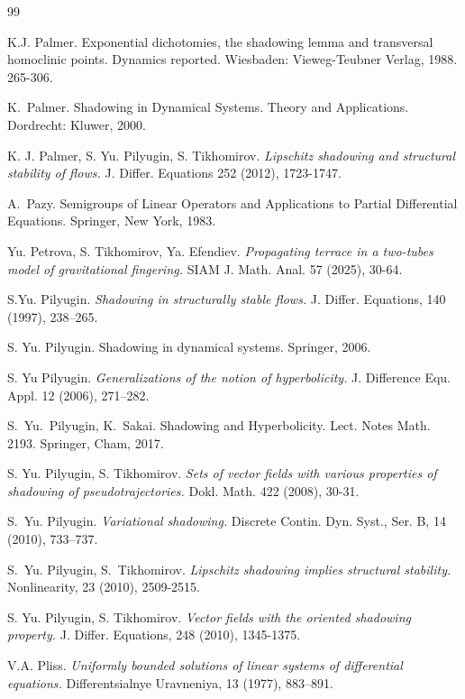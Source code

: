 \documentclass[12pt]{article}
\theoremstyle{definition}
\begin{document}
\begin{thebibliography}{99}
{
K.J. Palmer. Exponential dichotomies, the shadowing lemma and transversal homoclinic points. Dynamics reported. Wiesbaden: Vieweg-Teubner Verlag, 1988. 265-306.

K.~Palmer.
\newblock Shadowing in Dynamical Systems. Theory and Applications.
\newblock Dordrecht: Kluwer, 2000.

K. J. Palmer, S. Yu. Pilyugin, S. Tikhomirov.
\textit{Lipschitz shadowing and structural stability of flows.}
	J. Differ. Equations 252 (2012), 1723-1747.

A.~Pazy.
\newblock Semigroups of Linear Operators and Applications to Partial Differential Equations.
\newblock Springer, New York, 1983.

Yu. Petrova, S. Tikhomirov, Ya. Efendiev. \textit{Propagating terrace in a two-tubes model of gravitational fingering.} SIAM J. Math. Anal. 57 (2025), 30-64.

S.Yu. Pilyugin. \textit{Shadowing in structurally stable flows.} J. Differ. Equations, 140 (1997), 238–265.


 S. Yu. Pilyugin. Shadowing in dynamical systems. Springer, 2006.

 S. Yu Pilyugin. \textit{Generalizations of the notion of hyperbolicity.} J. Difference Equ. Appl. 12 (2006), 271–282.

S.~Yu.~Pilyugin, K.~Sakai.
\newblock Shadowing and Hyperbolicity.
\newblock Lect. Notes Math. 2193. Springer, Cham, 2017.

S. Yu. Pilyugin, S. Tikhomirov. \textit{Sets of vector fields with various properties of shadowing of pseudotrajectories.} Dokl. Math. 422 (2008), 30-31.

S.~Yu. Pilyugin.
\newblock \textit{Variational shadowing.}
\newblock Discrete Contin. Dyn. Syst., Ser. B, 14 (2010), 733--737.

S.~Yu. Pilyugin, S.~Tikhomirov.
\newblock \textit{Lipschitz shadowing implies structural stability.}
\newblock Nonlinearity, 23 (2010), 2509-2515.

S. Yu. Pilyugin, S. Tikhomirov.
\textit{Vector fields with the oriented shadowing property.}
J. Differ. Equations, 248 (2010), 1345-1375.

 V.A. Pliss. \textit{Uniformly bounded solutions of linear systems of differential equations.} Differentsialnye Uravneniya, 13 (1977), 883–891.

}
\end{thebibliography}
\end{document}

